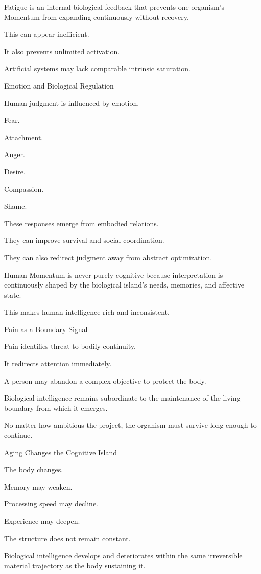 Fatigue is an internal biological feedback that prevents one organism’s Momentum from expanding continuously without recovery.

This can appear inefficient.

It also prevents unlimited activation.

Artificial systems may lack comparable intrinsic saturation.

Emotion and Biological Regulation

Human judgment is influenced by emotion.

Fear.

Attachment.

Anger.

Desire.

Compassion.

Shame.

These responses emerge from embodied relations.

They can improve survival and social coordination.

They can also redirect judgment away from abstract optimization.

Human Momentum is never purely cognitive because interpretation is continuously shaped by the biological island’s needs, memories, and affective state.

This makes human intelligence rich and inconsistent.

Pain as a Boundary Signal

Pain identifies threat to bodily continuity.

It redirects attention immediately.

A person may abandon a complex objective to protect the body.

Biological intelligence remains subordinate to the maintenance of the living boundary from which it emerges.

No matter how ambitious the project, the organism must survive long enough to continue.

Aging Changes the Cognitive Island

The body changes.

Memory may weaken.

Processing speed may decline.

Experience may deepen.

The structure does not remain constant.

Biological intelligence develops and deteriorates within the same irreversible material trajectory as the body sustaining it.

